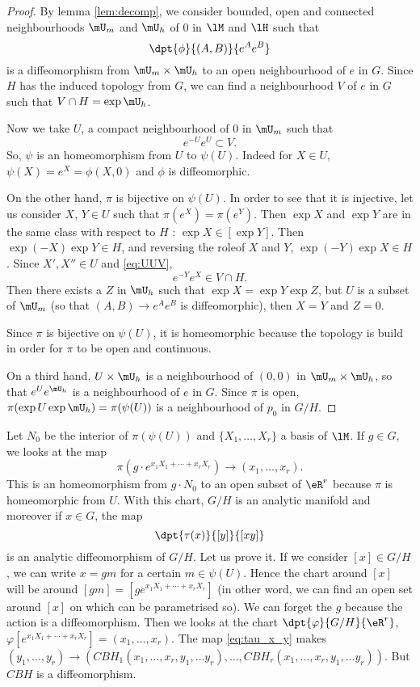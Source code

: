 \begin{proof}
By lemma \ref{lem:decomp}, we consider bounded, open and connected neighbourhoods $\mU_m$ and $\mU_h$ of $0$ in $\lM$ and $\lH$ such that 
\[
  \dpt{\phi}{(A,B)}{e^Ae^B}
\]
is a diffeomorphism from $\mU_m\times\mU_h$ to an open neighbourhood of $e$ in $G$. Since $H$ has the induced topology from $G$, we can find a neighbourhood $V$ of $e$ in $G$ such that $V\cap H=\exp\mU_h$. 

Now we take $U$, a compact neighbourhood of $0$ in $\mU_m$ such that 
\begin{equation}\label{eq:UUV}
  e^{-U}e^{U}\subset V.
\end{equation}
So, $\psi$ is an homeomorphism from $U$ to $\psi(U)$. Indeed for $X\in U$, $\psi(X)=e^X=\phi(X,0)$ and $\phi$ is diffeomorphic. 

On the other hand, $\pi$ is bijective on $\psi(U)$. In order to see that it is injective, let us consider $X$, $Y\in U$ such that $\pi(e^{X})=\pi(e^{Y})$. Then $\exp X$ and $\exp Y$ are in the same class with respect to $H$ : $\exp X\in[\exp Y]$. Then $\exp(-X)\exp Y\in H$, and reversing the role\angl of $X$ and $Y$, $\exp(-Y)\exp X\in H$. Since $X',X''\in U$ and \eqref{eq:UUV}, 
\[
  e^{-Y}e^{X}\in V\cap H.
\]
Then there exists a $Z$ in $\mU_h$ such that $\exp X=\exp Y\exp Z$, but $U$ is a subset of $\mU_m$ (so that $(A,B)\to e^Ae^B$ is diffeomorphic), then $X=Y$ and $Z=0$.

Since $\pi$ is bijective on $\psi(U)$, it is homeomorphic because the topology is build in order for $\pi$ to be open and continuous.

On a third hand, $U\times\mU_h$ is a neighbourhood of $(0,0)$ in $\mU_m\times\mU_h$, so that $e^Ue^{\mU_h}$ is a neighbourhood of $e$ in $G$. Since $\pi$ is open, $\pi(\exp U\exp \mU_h)=\pi(\psi(U))$ is a neighbourhood of $p_0$ in $G/H$.
\end{proof}


Let $N_0$ be the interior of $\pi(\psi(U))$ and $\{X_1,\ldots, X_r\}$ a basis of $\lM$. If $g\in G$, we looks at the map
\[
  \pi(g\cdot e^{x_1X_1+\cdots+x_rX_r})\to(x_1,\ldots,x_r).
\]
This is an homeomorphism from $g\cdot N_0$ to an open subset of $\eR^r$ because $\pi$ is homeomorphic from $U$. With this chart, $G/H$ is an analytic manifold  and moreover if $x\in G$, the map
\begin{equation}\label{eq:tau_x_y}
  \dpt{\tau(x)}{[y]}{[xy]}
\end{equation}
is an analytic diffeomorphism of $G/H$. Let us prove it. If we consider $[x]\in G/H$, we can write $x=gm$ for a certain $m\in\psi(U)$. Hence the chart around $[x]$ will be around $[gm]=[ge^{x_1X_1+\cdots+x_rX_r}]$ (in other word, we can find an open set around $[x]$ on which can be parametrised so). We can forget the $g$ because the action is a diffeomorphism. Then we looks at the chart $\dpt{\varphi}{G/H}{\eR^r}$, $\varphi[e^{x_1X_1+\cdots+x_rX_r}]=(x_1,\ldots,x_r)$. The map \eqref{eq:tau_x_y} makes $(y_1,\ldots,y_r)\to( CBH_1(x_1,\ldots,x_r,y_1,\ldots y_r),\ldots, CBH_r(x_1,\ldots,x_r,y_1,\ldots y_r))$. But $CBH$ is a diffeomorphism.


